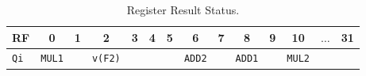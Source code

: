 \begin{enumerate}
    \begin{table}[!htp]
        \centering
        \begin{tabular}{@{} l | c c c c c c c c c c c c c @{}}
            \toprule
            RF              & 0                     & 1             & 2                     & 3             & 4             & 5             & 6                     & 7             & 8             & 9             & 10                    & $\dots$           & 31            \\
            \midrule
            \texttt{Qi}     & \texttt{MUL1}         &               & \texttt{v(F2)}        &               &               &               & \texttt{ADD2}         &               & \texttt{ADD1} &               & \texttt{MUL2}         &                   &               \\
            \bottomrule
        \end{tabular}
        \caption*{Register Result Status.}
    \end{table}

    \newpage
    \setcounter{enumi}{9}



\end{enumerate}
